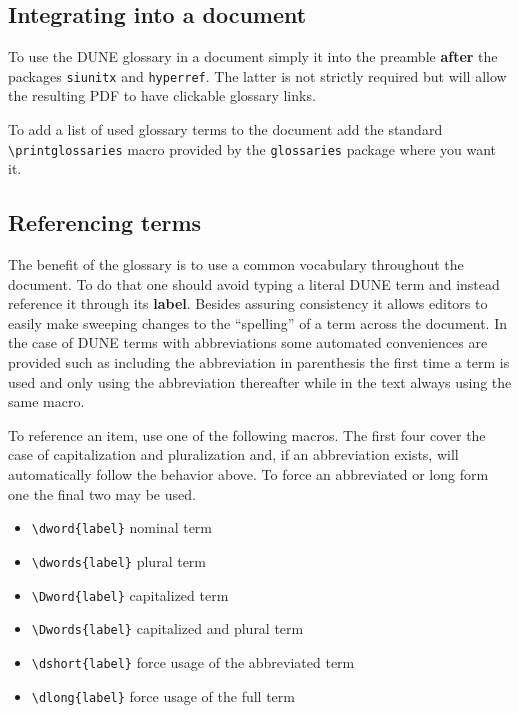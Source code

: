\documentclass{article}
\begin{document}
\subsection{Integrating into a document}

To use the DUNE glossary in a document simply \verb|| it into
the preamble \textbf{after} the packages \texttt{siunitx} and
\texttt{hyperref}. 
The latter is not strictly required but will allow the resulting PDF
to have clickable glossary links. 

To add a list of used glossary terms to the document add the standard
\verb|\printglossaries| macro provided by the \texttt{glossaries}
package where you want it.

\subsection{Referencing terms}
\label{sec:referencing}

The benefit of the glossary is to use a common vocabulary throughout
the document. 
To do that one should avoid typing a literal DUNE term and instead
reference it through its \textbf{label}. 
Besides assuring consistency it allows editors to easily make sweeping
changes to the ``spelling'' of a term across the document. 
In the case of DUNE terms with abbreviations some automated
conveniences are provided such as including the abbreviation in
parenthesis the first time a term is used and only using the
abbreviation thereafter while in the text always using the same macro.

To reference an item, use one of the following macros. 
The first four cover the case of capitalization and pluralization and,
if an abbreviation exists, will automatically follow the behavior
above. 
To force an abbreviated or long form one the final two may be used.

\begin{itemize}
\item \verb|\dword{label}| nominal term
\item \verb|\dwords{label}| plural term
\item \verb|\Dword{label}| capitalized term
\item \verb|\Dwords{label}| capitalized and plural term
\item \verb|\dshort{label}| force usage of the abbreviated term
\item \verb|\dlong{label}| force usage of the full term
\end{itemize}
\end{document}
